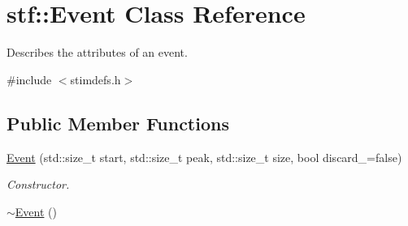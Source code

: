 \hypertarget{classstf_1_1Event}{
\section{stf::Event Class Reference}
\label{classstf_1_1Event}
}


Describes the attributes of an event.  




{\ttfamily \#include $<$stimdefs.h$>$}

\subsection*{Public Member Functions}
\begin{DoxyCompactItemize}
\item 
\hypertarget{classstf_1_1Event_a9f60134377b70dc610c2a49259d9d5f3}{
\hyperlink{classstf_1_1Event_a9f60134377b70dc610c2a49259d9d5f3}{Event} (std::size\_\-t start, std::size\_\-t peak, std::size\_\-t size, bool discard\_\-=false)}
\label{classstf_1_1Event_a9f60134377b70dc610c2a49259d9d5f3}

\begin{DoxyCompactList}\small\item\em Constructor. \item\end{DoxyCompactList}\item 
\hypertarget{classstf_1_1Event_a4665d0e3a410f77f5c61cabebe00ace9}{
\hyperlink{classstf_1_1Event_a4665d0e3a410f77f5c61cabebe00ace9}{$\sim$Event} ()}
\label{classstf_1_1Event_a4665d0e3a410f77f5c61cabebe00ace9}


\end{DoxyCompactItemize}
